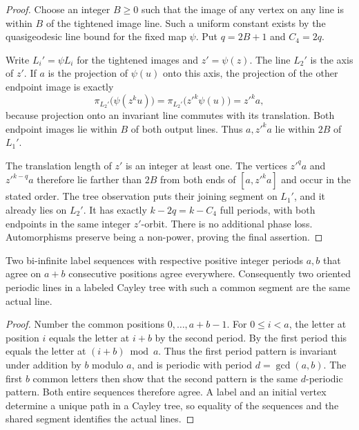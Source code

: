 \begin{proof}
Choose an integer $B\ge0$ such that the image of any vertex on any
line is within $B$ of the tightened image line. Such a uniform
constant exists by the quasigeodesic line bound for the fixed map
$\psi$. Put $q=2B+1$ and $C_4=2q$.

Write $L_i'=\psi L_i$ for the tightened images and $z'=\psi(z)$.
The line $L_2'$ is the axis of $z'$. If $a$ is the projection of
$\psi(u)$ onto this axis, the projection of the other endpoint
image is exactly
\[
 \pi_{L_2'}\bigl(\psi(z^ku)\bigr)
 =\pi_{L_2'}\bigl(z'^k\psi(u)\bigr)=z'^k a,
\]
because projection onto an invariant line commutes with its
translation. Both endpoint images lie within $B$ of both output
lines. Thus $a,z'^ka$ lie within $2B$ of $L_1'$.

The translation length of $z'$ is an integer at least one. The
vertices $z'^q a$ and $z'^{k-q}a$ therefore lie farther than
$2B$ from both ends of $[a,z'^ka]$ and occur in the stated order.
The tree observation puts their joining segment on $L_1'$, and
it already lies on $L_2'$. It has exactly $k-2q=k-C_4$ full
periods, with both endpoints in the same integer $z'$-orbit.
There is no additional phase loss. Automorphisms preserve being a
non-power, proving the final assertion.
\end{proof}

\begin{lemma}
\label{exp:periodic-labels}
Two bi-infinite label sequences with respective positive integer
periods $a,b$ that agree on $a+b$ consecutive positions agree
everywhere. Consequently two oriented periodic lines in a labeled
Cayley tree with such a common segment are the same actual line.
\end{lemma}

\begin{proof}
Number the common positions $0,\ldots,a+b-1$. For
$0\le i<a$, the letter at position $i$ equals the letter at
$i+b$ by the second period. By the first period this equals the
letter at $(i+b)\bmod a$. Thus the first period pattern is
invariant under addition by $b$ modulo $a$, and is periodic with
period $d=\gcd(a,b)$. The first $b$ common letters then show that
the second pattern is the same $d$-periodic pattern. Both entire
sequences therefore agree. A label and an initial vertex determine
a unique path in a Cayley tree, so equality of the sequences and
the shared segment identifies the actual lines.
\end{proof}

